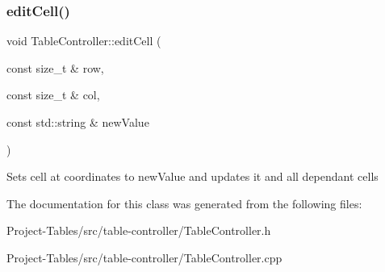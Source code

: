 \subsubsection{\texorpdfstring{edit\+Cell()}{editCell()}}
{\footnotesize\ttfamily void Table\+Controller\+::edit\+Cell (\begin{DoxyParamCaption}\item[{const size\+\_\+t \&}]{row,  }\item[{const size\+\_\+t \&}]{col,  }\item[{const std\+::string \&}]{new\+Value }\end{DoxyParamCaption})}

Sets cell at coordinates to new\+Value and updates it and all dependant cells 

The documentation for this class was generated from the following files\+:\begin{DoxyCompactItemize}
\item 
Project-\/\+Tables/src/table-\/controller/Table\+Controller.\+h\item 
Project-\/\+Tables/src/table-\/controller/Table\+Controller.\+cpp\end{DoxyCompactItemize}
